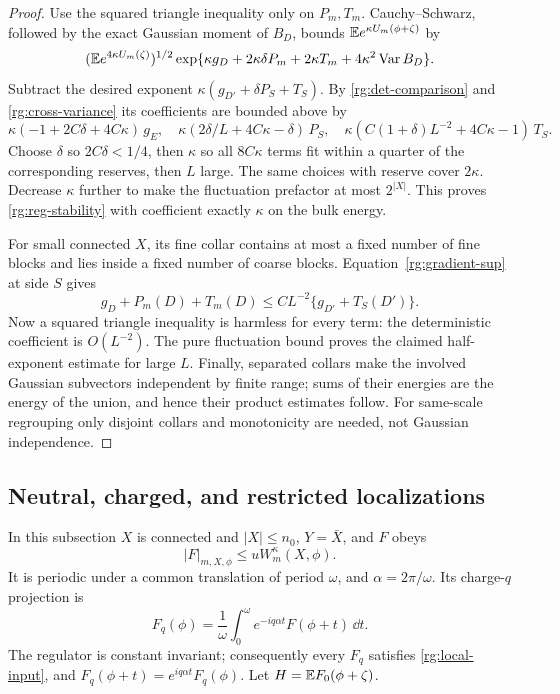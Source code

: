 \begin{proof}
Use the squared triangle inequality only on $P_m,T_m$.  Cauchy--Schwarz, followed by the exact Gaussian moment of $B_D$, bounds $\mathbb E e^{\kappa U_m(\phi+\zeta)}$ by
\[
 (\mathbb E e^{4\kappa U_m(\zeta)})^{1/2}
 \exp\{\kappa g_D+2\kappa\delta P_m+2\kappa T_m+4\kappa^2\operatorname{Var} B_D\}.
\]
Subtract the desired exponent $\kappa(g_{D'}+\delta P_S+T_S)$.  By \eqref{rg:det-comparison} and \eqref{rg:cross-variance} its coefficients are bounded above by
\[
 \kappa(-1+2C\delta+4C\kappa)\,g_E,\quad
 \kappa(2\delta/L+4C\kappa-\delta)\,P_S,\quad
 \kappa(C(1+\delta)L^{-2}+4C\kappa-1)\,T_S.
\]
Choose $\delta$ so $2C\delta<1/4$, then $\kappa$ so all $8C\kappa$ terms fit within a quarter of the corresponding reserves, then $L$ large.  The same choices with reserve cover $2\kappa$.  Decrease $\kappa$ further to make the fluctuation prefactor at most $2^{|X|}$.  This proves \eqref{rg:reg-stability} with coefficient exactly $\kappa$ on the bulk energy.

For small connected $X$, its fine collar contains at most a fixed number of fine blocks and lies inside a fixed number of coarse blocks.  Equation~\eqref{rg:gradient-sup} at side $S$ gives
\[
 g_D+P_m(D)+T_m(D)\le CL^{-2}\{g_{D'}+T_S(D')\}.
\]
Now a squared triangle inequality is harmless for every term: the deterministic coefficient is $O(L^{-2})$.  The pure fluctuation bound proves the claimed half-exponent estimate for large $L$.  Finally, separated collars make the involved Gaussian subvectors independent by finite range; sums of their energies are the energy of the union, and hence their product estimates follow.  For same-scale regrouping only disjoint collars and monotonicity are needed, not Gaussian independence.
\end{proof}

\subsection{Neutral, charged, and restricted localizations}\label{rg:localization-section}

In this subsection $X$ is connected and $|X|\le n_0$, $Y=\bar X$, and $F$ obeys
\begin{equation}\label{rg:local-input}
 |F|_{m,X,\phi}\le uW_m^\kappa(X,\phi).
\end{equation}
It is periodic under a common translation of period $\omega$, and $\alpha=2\pi/\omega$.  Its charge-$q$ projection is
\[
 F_q(\phi)=\frac1\omega\int_0^\omega e^{-iq\alpha t}F(\phi+t)\,\dd t.
\]
The regulator is constant invariant; consequently every $F_q$ satisfies \eqref{rg:local-input}, and $F_q(\phi+t)=e^{iq\alpha t}F_q(\phi)$.  Let $H=\mathbb E F_0(\phi+\zeta)$.

